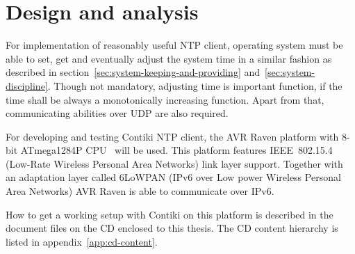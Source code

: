 
\chapter{Design and analysis}
For implementation of reasonably useful NTP client,
operating system must be able to set, get
and eventually adjust the system time in a similar fashion as
described in section~\ref{sec:system-keeping-and-providing} and~\ref{sec:system-discipline}.
Though not mandatory, adjusting time is important function,
if the time shall be always a monotonically increasing function.
Apart from that, communicating abilities over UDP are also required.

For developing and testing Contiki NTP client,
the AVR Raven platform with 8-bit ATmega1284P CPU~\cite{avr-datasheet} will be used.
This platform features IEEE~802.15.4 (Low-Rate Wireless Personal Area Networks) link layer support.
Together with an adaptation layer called 6LoWPAN (IPv6 over Low power Wireless Personal Area Networks)
AVR Raven is able to communicate over IPv6.

How to get a working setup with Contiki on this platform is described in
the document files on the CD enclosed to this thesis.
The CD content hierarchy is listed in appendix~\ref{app:cd-content}.








%
